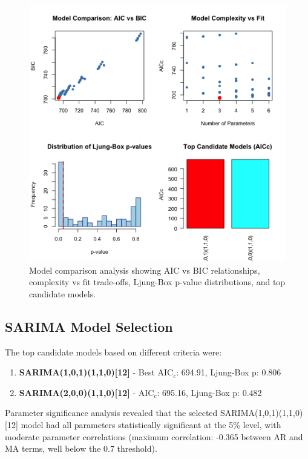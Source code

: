\documentclass[journal]{IEEEtran}
\begin{document}
\begin{figure}[h]
    \centering
    \includegraphics[width=1\linewidth]{plots/model-charts.png}
    \caption{Model comparison analysis showing AIC vs BIC relationships, complexity vs fit trade-offs, Ljung-Box p-value distributions, and top candidate models.}
    \label{fig:model_comparison}
\end{figure}

\subsection{SARIMA Model Selection}

The top candidate models based on different criteria were:

\begin{enumerate}
    \item \textbf{SARIMA(1,0,1)(1,1,0)[12]} - Best AIC$_c$: 694.91, Ljung-Box p: 0.806
    \item \textbf{SARIMA(2,0,0)(1,1,0)[12]} - AIC$_c$: 695.16, Ljung-Box p: 0.482
\end{enumerate}

Parameter significance analysis revealed that the selected SARIMA(1,0,1)(1,1,0)[12] model had all parameters statistically significant at the 5\% level, with moderate parameter correlations (maximum correlation: -0.365 between AR and MA terms, well below the 0.7 threshold).
\end{document}
